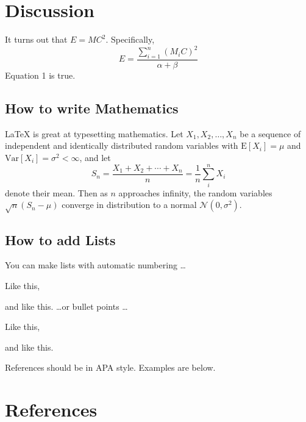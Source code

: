 \documentclass[12pt]{article}
\let\tempone\itemize
\let\temptwo\enditemize
\let\tempthree\enumerate
\let\tempfour\endenumerate
\renewenvironment{itemize}{\tempone\setlength{\itemsep}{0pt}}{\temptwo}
\renewenvironment{enumerate}{\tempthree\setlength{\itemsep}{0pt}}{\tempfour}
\begin{document}
\section{Discussion}

It turns out that $E = MC^2$.  Specifically,
\begin{equation}
E = \frac { \sum_{i=1}^n ( M_i C )^2 }{ \alpha + \beta }
\end{equation}
Equation 1 is true.

\subsection{How to write Mathematics}

\LaTeX{} is great at typesetting mathematics. Let $X_1, X_2, \ldots,
X_n$ be a sequence of independent and identically distributed random
variables with $\text{E}[X_i] = \mu$ and $\text{Var}[X_i] = \sigma^2 <
\infty$, and let
\[S_n = \frac{X_1 + X_2 + \cdots + X_n}{n}
      = \frac{1}{n}\sum_{i}^{n} X_i\]
denote their mean. Then as $n$ approaches infinity, the random
variables $\sqrt{n}(S_n - \mu)$ converge in distribution to a normal
$\mathcal{N}(0, \sigma^2)$.

\subsection{How to add Lists}

You can make lists with automatic numbering \dots

\begin{enumerate}
\item Like this,
\item and like this.
\end{enumerate}
\dots or bullet points \dots
\begin{itemize}
\item Like this,
\item and like this.
\end{itemize}

References should be in APA style. Examples are below.

%
%
\section*{References}
\end{document}
